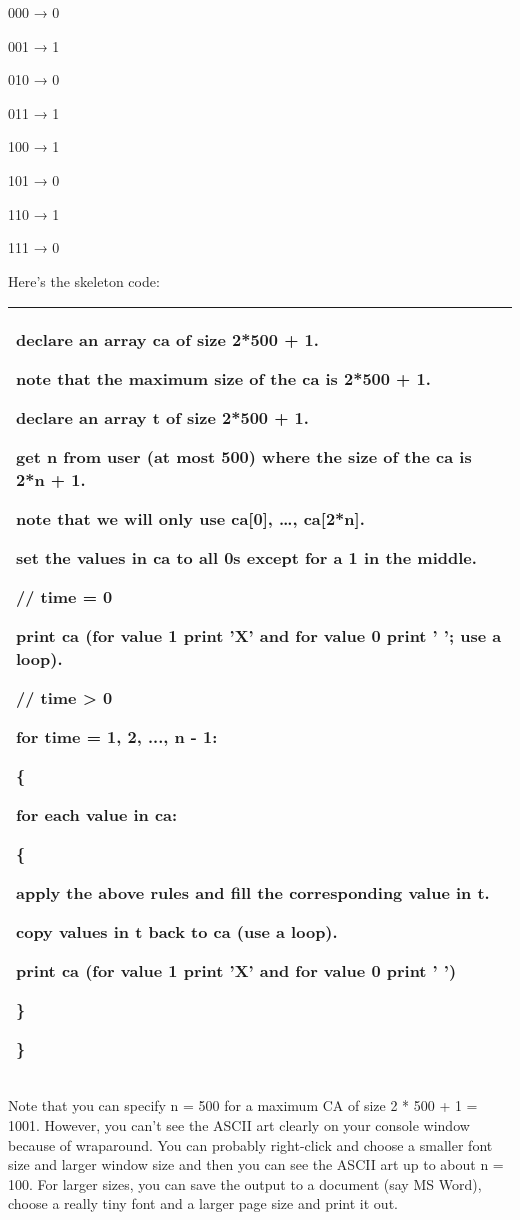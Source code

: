 \documentclass[
]{article}
\begin{document}
000 → 0

001 → 1

010 → 0

011 → 1

100 → 1

101 → 0

110 → 1

111 → 0

Here's the skeleton code:

\begin{longtable}[]{@{}l@{}}
\toprule
\endhead
\begin{minipage}[t]{0.97\columnwidth}\raggedright
declare an array ca of size 2*500 + 1.

note that the maximum size of the ca is 2*500 + 1.

declare an array t of size 2*500 + 1.

get n from user (at most 500) where the size of the ca is 2*n + 1.

note that we will only use ca{[}0{]}, \ldots, ca{[}2*n{]}.

set the values in ca to all 0s except for a 1 in the middle.

// time = 0

print ca (for value 1 print 'X' and for value 0 print ' '; use a loop).

// time \textgreater{} 0

for time = 1, 2, ..., n - 1:

\{

for each value in ca:

\{

apply the above rules and fill the corresponding value in t.

copy values in t back to ca (use a loop).

print ca (for value 1 print 'X' and for value 0 print ' ')

\}

\} \strut
\end{minipage}\tabularnewline
\bottomrule
\end{longtable}

Note that you can specify n = 500 for a maximum CA of size 2 * 500 + 1 =
1001. However, you can't see the ASCII art clearly on your console
window because of wraparound. You can probably right-click and choose a
smaller font size and larger window size and then you can see the ASCII
art up to about n = 100. For larger sizes, you can save the output to a
document (say MS Word), choose a really tiny font and a larger page size
and print it out.
\end{document}
